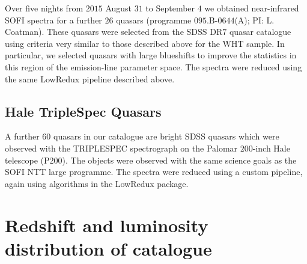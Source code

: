 Over five nights from $2015$ August $31$ to September $4$ we obtained near-infrared SOFI spectra for a further $26$ quasars (programme $095$.B-$0644$(A); PI: L. Coatman). 
These quasars were selected from the SDSS DR$7$ quasar catalogue using criteria very similar to those described above for the WHT sample. 
In particular, we selected quasars with large  blueshifts to improve the statistics in this region of the  emission-line parameter space. 
The spectra were reduced using the same LowRedux pipeline described above. 

\subsection{Hale TripleSpec Quasars}

A further $60$ quasars in our catalogue are bright SDSS quasars which were observed with the TRIPLESPEC spectrograph \citep{herter08} on the Palomar $200$-inch Hale telescope (P$200$). 
The objects were observed with the same science goals as the SOFI NTT large programme. 
The spectra were reduced using a custom pipeline, again using algorithms in the LowRedux package. 

\section{Redshift and luminosity distribution of catalogue}

